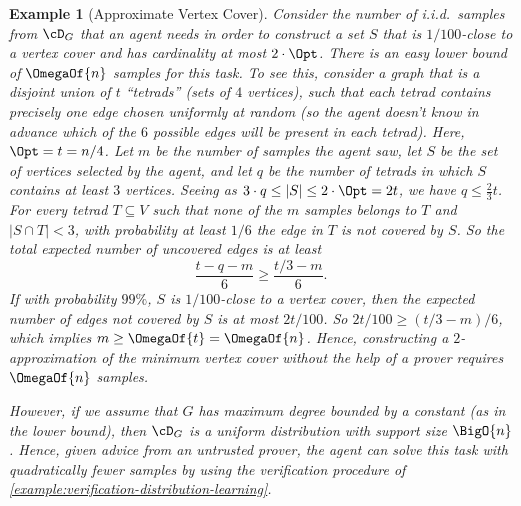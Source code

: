\documentclass[11pt]{article}
\newtheorem{example}[theorem]{Example}
\begin{document}
\begin{example}[Approximate Vertex Cover]
	Consider the number of i.i.d.\ samples from $\cD_G$ that an agent needs in order to construct a set $S$ that is $1/100$-close to a vertex cover and has cardinality at most $2\cdot\Opt$. There is an easy lower bound of $\OmegaOf{n}$ samples for this task. To see this, consider a graph that is a disjoint union of $t$ ``tetrads'' (sets of $4$ vertices), such that each tetrad contains precisely one edge chosen uniformly at random (so the agent doesn't know in advance which of the $6$ possible edges will be present in each tetrad). Here, $\Opt = t = n/4$. Let $m$ be the number of samples the agent saw, let $S$ be the set of vertices selected by the agent, and let $q$ be the number of tetrads in which $S$ contains at least $3$ vertices. Seeing as $3\cdot q \leq |S| \leq 2\cdot\Opt = 2t$, we have $q \leq \frac{2}{3}t$. For every tetrad $T \subseteq V$ such that none of the $m$ samples belongs to $T$ and $|S\cap T| < 3$, with probability at least $1/6$ the edge in $T$ is not covered by $S$. So the total expected number of uncovered edges is at least
	\[
		\frac{t - q - m}{6} \geq \frac{t/3 - m}{6}.
	\]
	If with probability $99\%$, $S$ is $1/100$-close to a vertex cover, then the expected number of edges not covered by $S$ is at most $2t/100$. So $2t/100 \geq (t/3 - m)/6$, which implies $m \geq \OmegaOf{t} = \OmegaOf{n}$. Hence, constructing a $2$-approximation of the minimum vertex cover without the help of a prover requires $\OmegaOf{n}$ samples.

	However, if we assume that $G$ has maximum degree bounded by a constant (as in the lower bound), then $\cD_G$ is a uniform distribution with support size $\BigO{n}$. Hence, given advice from an untrusted prover, the agent can solve this task with quadratically fewer samples by using the verification procedure of \cref{example:verification-distribution-learning}.


\end{example}
\end{document}
